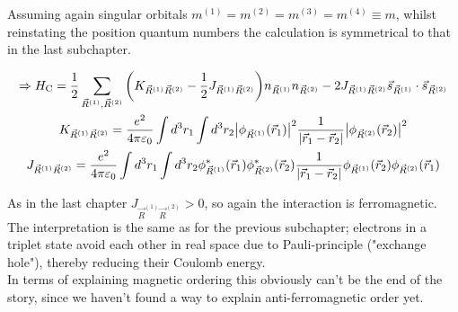 \documentclass[../../main.tex]{subfiles}
\begin{document}
\hfill \newline

Assuming again singular orbitals $m^{(1)} = m^{(2)} = m^{(3)} = m^{(4)} \equiv m$, whilst reinstating the position quantum numbers the calculation is symmetrical to that in the last subchapter.

\begin{gather}
\Rightarrow H_{\text{C}} = \frac12 \sum_{\vec{R}^{(1)}, \vec{R}^{(2)}} \bigg( K_{\vec{R}^{(1)} \vec{R}^{(2)}} - \frac12 J_{\vec{R}^{(1)} \vec{R}^{(2)}} \bigg) n_{\vec{R}^{(1)}} n_{\vec{R}^{(2)}} - 2 J_{\vec{R}^{(1)} \vec{R}^{(2)}} \vec{s}_{\vec{R}^{(1)}} \cdot \vec{s}_{\vec{R}^{(2)}} \\
	K_{\vec{R}^{(1)} \vec{R}^{(2)}} = \frac{e^2}{4 \pi \varepsilon_0} \int d^3r_1 \int d^3r_2 \abs{\phi_{\vec{R}^{(1)}}(\vec{r}_1)}^2 \frac{1}{\abs{\vec{r}_1-\vec{r}_2}} \abs{\phi_{\vec{R}^{(2)}}(\vec{r}_2)}^2 \\
	J_{\vec{R}^{(1)}\vec{R}^{(2)}} = \frac{e^2}{4\pi\varepsilon_0} \int d^3r_1 \int d^3r_2 \phi_{\vec{R}^{(1)}}^* (\vec{r}_1) \phi_{\vec{R}^{(2)}}^*(\vec{r}_2) \frac{1}{\abs{\vec{r}_1-\vec{r}_2}} \phi_{\vec{R}^{(1)}}(\vec{r}_2) \phi_{\vec{R}^{(2)}}(\vec{r}_1)
\end{gather}

As in the last chapter $J_{\vec{R}^{(1)} \vec{R}^{(2)}} > 0$, so again the interaction is ferromagnetic. The interpretation is the same as for the previous subchapter; electrons in a triplet state avoid each other in real space due to Pauli-principle ("exchange hole"), thereby reducing their Coulomb energy. \\ 

In terms of explaining magnetic ordering this obviously can't be the end of the story, since we haven't found a way to explain anti-ferromagnetic order yet.
\end{document}
